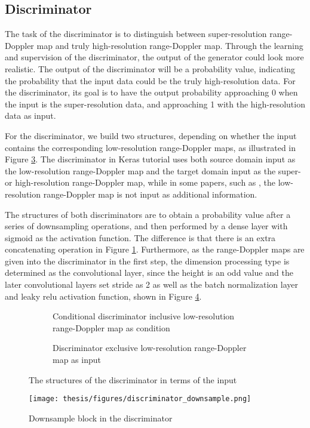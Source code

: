 \subsection{Discriminator} \label{discriminator}
The task of the discriminator is to distinguish between super-resolution range-Doppler map and truly high-resolution range-Doppler map. Through the learning and supervision of the discriminator, the output of the generator could look more realistic. The output of the discriminator will be a probability value, indicating the probability that the input data could be the truly high-resolution data. For the discriminator, its goal is to have the output probability approaching 0 when the input is the super-resolution data, and approaching 1 with the high-resolution data as input.

For the discriminator, we build two structures, depending on whether the input contains the corresponding low-resolution range-Doppler maps, as illustrated in Figure \ref{structures of the discriminator}. The discriminator in Keras tutorial \cite{team_keras_cgan} uses both source domain input as the low-resolution range-Doppler map and the target domain input as the super- or high-resolution range-Doppler map, while in some papers, such as \cite{ledig_photo-realistic_2017}, the low-resolution range-Doppler map is not input as additional information.

The structures of both discriminators are to obtain a probability value after a series of downsampling operations, and then performed by a dense layer with sigmoid as the activation function. The difference is that there is an extra concatenating operation in Figure \ref{discriminator inclusive low resolution image as input}. Furthermore, as the range-Doppler maps are given into the discriminator in the first step, the dimension processing type is determined as the convolutional layer, since the height is an odd value and the later convolutional layers set stride as 2 as well as the batch normalization layer and leaky \gls{relu} activation function, shown in Figure \ref{downsample block in discriminator}.

\begin{figure}
    \centering
    \hspace{-0.4cm}
    \begin{subfigure}{0.49\textwidth}
        \centering
        \caption{Conditional discriminator inclusive low-resolution range-Doppler map as condition}
        \label{discriminator inclusive low resolution image as input}
    \end{subfigure}
    \begin{subfigure}{0.49\textwidth}
        \centering
        \caption{Discriminator exclusive low-resolution range-Doppler map as input}
        \label{discriminator exclusive low resolution image as input}
    \end{subfigure}
    \caption{The structures of the discriminator in terms of the input}
	\label{structures of the discriminator}
\end{figure}

\begin{figure}
	\centering
	\texttt{[image: thesis/figures/discriminator\_downsample.png]}
	\caption{Downsample block in the discriminator}
	\label{downsample block in discriminator}
\end{figure}